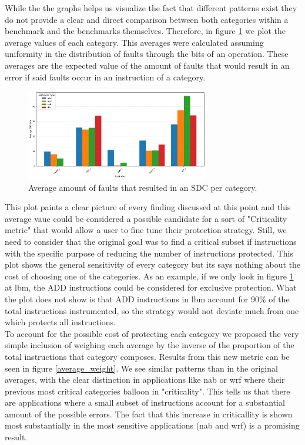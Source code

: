 \documentclass[lettersize,journal]{IEEEtran}
\begin{document}
While the the graphs helps us visualize the fact that different patterns exist they do not provide a clear and direct comparison between both categories within a benchmark and the benchmarks themselves. Therefore, in figure \ref{average} we plot the average values of each category. This averages were calculated assuming uniformity in the distribution of faults through the bits of an operation. These averages are the expected value of the amount of faults that would result in an error if said faults occur in an instruction of a category.
\begin{figure}[!t] 
    \centering
    \includegraphics[width=8cm]{plots/average_arithmetic/benchmarks_grouped_by_category.pdf}
\caption{Average amount of faults that resulted in an SDC per category.}
\label{average}
\end{figure}
This plot paints a clear picture of every finding discussed at this point and this average vaue could be considered a possible candidate for a sort of "Criticality metric" that would allow a user to fine tune their protection strategy. Still, we need to consider that the original goal was to find a critical subset if instructions with the specific purpose of reducing the number of instructions protected. This plot shows the general sensitivity of every category but its says nothing about the cost of choosing one of the categories. As an example, if we only look in figure \ref{average} at lbm, the ADD instructions could be considered for exclusive protection. What the plot does not show is that ADD instructions in lbm account for 90\% of the total instructions instrumented, so the strategy would not deviate much from one which protects all instructions. \\
To account for the possible cost of protecting each category we proposed the very simple inclusion of weighing each average by the inverse of the proportion of the total instructions that category composes. Results from this new metric can be seen in figure \ref{average_weight}. We see similar patterns than in the original averages, with the clear distinction in applications like nab or wrf where their previous most critical categories balloon in "criticality". This tells us that there are applications where a small subset of instructions account for a substantial amount of the possible errors. The fact that this increase in criticallity is shown most substantially in the most sensitive applications (nab and wrf) is a promising result.
\end{document}
